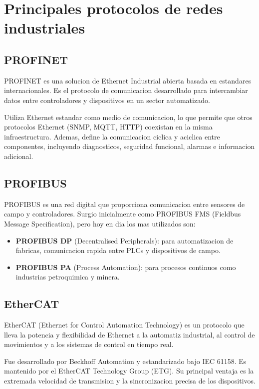 \section{Principales protocolos de redes industriales}

\subsection{PROFINET}

PROFINET es una solucion de Ethernet Industrial abierta basada en estandares
internacionales. Es el protocolo de comunicacion desarrollado para intercambiar
datos entre controladores y dispositivos en un sector automatizado.

Utiliza Ethernet estandar como medio de comunicacion, lo que permite que otros
protocolos Ethernet (SNMP, MQTT, HTTP) coexistan en la misma infraestructura.
Ademas, define la comunicacion ciclica y aciclica entre componentes, incluyendo
diagnosticos, seguridad funcional, alarmas e informacion adicional.

\subsection{PROFIBUS}

PROFIBUS es una red digital que proporciona comunicacion entre sensores de
campo y controladores. Surgio inicialmente como PROFIBUS FMS (Fieldbus Message
Specification), pero hoy en dia los mas utilizados son:

\begin{itemize}
    \item \textbf{PROFIBUS DP} (Decentralised Peripherals): para automatizacion de
    fabricas, comunicacion rapida entre PLCs y dispositivos de campo.
    \item \textbf{PROFIBUS PA} (Process Automation): para procesos continuos como
    industrias petroquimica y minera.
\end{itemize}

\subsection{EtherCAT}

EtherCAT (Ethernet for Control Automation Technology) es un protocolo que lleva
la potencia y flexibilidad de Ethernet a la automatiz industrial, al control de
movimientos y a los sistemas de control en tiempo real.

Fue desarrollado por Beckhoff Automation y estandarizado bajo IEC 61158. Es
mantenido por el EtherCAT Technology Group (ETG). Su principal ventaja es la
extremada velocidad de transmision y la sincronizacion precisa de los dispositivos.

